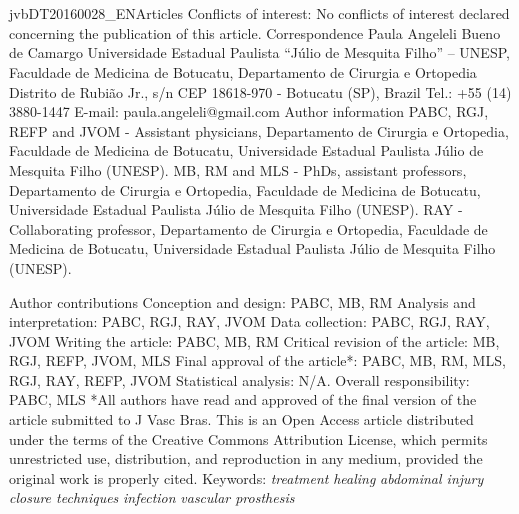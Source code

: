 \documentclass[numberinsection,times,10pt,spreadimages]{memoir}
\begin{document}
\section{}

jvbDT20160028\_{}ENArticles
Conflicts of interest: No conflicts of interest declared concerning the
publication of this article.
\label{*}
Correspondence Paula Angeleli Bueno de Camargo Universidade
Estadual Paulista “Júlio de Mesquita Filho” – UNESP, Faculdade de Medicina de
Botucatu, Departamento de Cirurgia e Ortopedia Distrito de Rubião Jr., s/n CEP
18618-970 - Botucatu (SP), Brazil Tel.: +55 (14) 3880-1447 E-mail:
paula.angeleli@gmail.com
Author information PABC, RGJ, REFP and JVOM - Assistant physicians,
Departamento de Cirurgia e Ortopedia, Faculdade de Medicina de Botucatu,
Universidade Estadual Paulista Júlio de Mesquita Filho (UNESP). MB, RM and
MLS - PhDs, assistant professors, Departamento de Cirurgia e Ortopedia,
Faculdade de Medicina de Botucatu, Universidade Estadual Paulista Júlio de
Mesquita Filho (UNESP). RAY - Collaborating professor, Departamento de
Cirurgia e Ortopedia, Faculdade de Medicina de Botucatu, Universidade
Estadual Paulista Júlio de Mesquita Filho (UNESP).

Author contributions Conception and design: PABC, MB, RM Analysis and
interpretation: PABC, RGJ, RAY, JVOM Data collection: PABC, RGJ, RAY, JVOM
Writing the article: PABC, MB, RM Critical revision of the article: MB, RGJ,
REFP, JVOM, MLS Final approval of the article*: PABC, MB, RM, MLS, RGJ, RAY,
REFP, JVOM Statistical analysis: N/A. Overall responsibility: PABC, MLS *All
authors have read and approved of the final version of the article submitted
to J Vasc Bras.
This is an Open Access article distributed under the terms of the
Creative Commons Attribution License, which permits unrestricted use,
distribution, and reproduction in any medium, provided the original work is
properly cited.
Keywords: \textit{treatment}
\textit{healing}
\textit{abdominal injury closure techniques}
\textit{infection}
\textit{vascular prosthesis}
\end{document}

